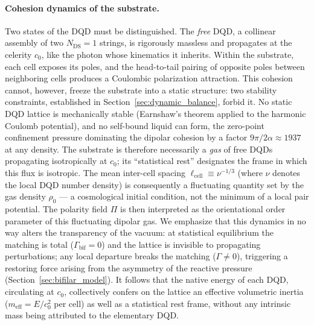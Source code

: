 \documentclass[11pt,a4paper]{article}
\theoremstyle{plain}
\theoremstyle{remark}
\newcommand{\Ncd}{\ensuremath{N_{\mathrm{DS}}}}
\begin{document}
\paragraph{Cohesion dynamics of the substrate.}
Two states of the DQD must be distinguished. The \emph{free} DQD, a collinear assembly of two $\Ncd = 1$ strings, is rigorously massless and propagates at the celerity $c_0$, like the photon whose kinematics it inherits. Within the substrate, each cell exposes its poles, and the head-to-tail pairing of opposite poles between neighboring cells produces a Coulombic polarization attraction. This cohesion cannot, however, freeze the substrate into a static structure: two stability constraints, established in Section~\ref{sec:dynamic_balance}, forbid it. No static DQD lattice is mechanically stable (Earnshaw's theorem applied to the harmonic Coulomb potential), and no self-bound liquid can form, the zero-point confinement pressure dominating the dipolar cohesion by a factor $9\pi/2\alpha \approx 1937$ at any density. The substrate is therefore necessarily a \emph{gas} of free DQDs propagating isotropically at $c_0$; its ``statistical rest'' designates the frame in which this flux is isotropic. The mean inter-cell spacing $\ell_{\text{cell}} \equiv \nu^{-1/3}$ (where $\nu$ denotes the local DQD number density) is consequently a fluctuating quantity set by the gas density $\rho_0$ --- a cosmological initial condition, not the minimum of a local pair potential. The polarity field $\Pi$ is then interpreted as the orientational order parameter of this fluctuating dipolar gas. We emphasize that this dynamics in no way alters the transparency of the vacuum: at statistical equilibrium the matching is total ($\Gamma_{\text{bif}} = 0$) and the lattice is invisible to propagating perturbations; any local departure breaks the matching ($\Gamma \neq 0$), triggering a restoring force arising from the asymmetry of the reactive pressure (Section~\ref{sec:bifilar_model}). It follows that the native energy of each DQD, circulating at $c_0$, collectively confers on the lattice an effective volumetric inertia ($m_{\text{eff}} = E/c_0^2$ per cell) as well as a statistical rest frame, without any intrinsic mass being attributed to the elementary DQD.
\end{document}

